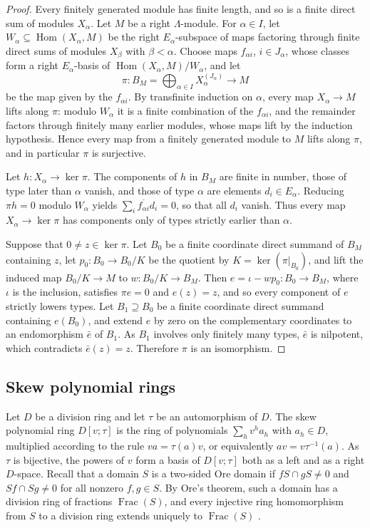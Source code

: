 \documentclass[11pt,a4paper]{amsart}
\numberwithin{equation}{section}
\newcommand{\Hom}{\operatorname{Hom}}
\newcommand{\Frac}{\operatorname{Frac}}
\begin{document}
\begin{proof}
Every finitely generated module has finite length, and so is a finite direct sum of modules $X_\alpha$. Let $M$ be a right $\Lambda$-module. For $\alpha\in I$, let $W_\alpha\subseteq\Hom(X_\alpha,M)$ be the right $E_\alpha$-subspace of maps factoring through finite direct sums of modules $X_\beta$ with $\beta<\alpha$. Choose maps $f_{\alpha i}$, $i\in J_\alpha$, whose classes form a right $E_\alpha$-basis of $\Hom(X_\alpha,M)/W_\alpha$, and let
\[
\pi\colon B_M=\textstyle\bigoplus_{\alpha\in I}X_\alpha^{(J_\alpha)}\to M
\]
be the map given by the $f_{\alpha i}$. By transfinite induction on $\alpha$, every map $X_\alpha\to M$ lifts along $\pi$: modulo $W_\alpha$ it is a finite combination of the $f_{\alpha i}$, and the remainder factors through finitely many earlier modules, whose maps lift by the induction hypothesis. Hence every map from a finitely generated module to $M$ lifts along $\pi$, and in particular $\pi$ is surjective.

Let $h\colon X_\alpha\to\ker\pi$. The components of $h$ in $B_M$ are finite in number, those of type later than $\alpha$ vanish, and those of type $\alpha$ are elements $d_i\in E_\alpha$. Reducing $\pi h=0$ modulo $W_\alpha$ yields $\sum_i\overline{f_{\alpha i}}d_i=0$, so that all $d_i$ vanish. Thus every map $X_\alpha\to\ker\pi$ has components only of types strictly earlier than $\alpha$.

Suppose that $0\ne z\in\ker\pi$. Let $B_0$ be a finite coordinate direct summand of $B_M$ containing $z$, let $p_0\colon B_0\to B_0/K$ be the quotient by $K=\ker(\pi|_{B_0})$, and lift the induced map $B_0/K\to M$ to $w\colon B_0/K\to B_M$. Then $e=\iota-wp_0\colon B_0\to B_M$, where $\iota$ is the inclusion, satisfies $\pi e=0$ and $e(z)=z$, and so every component of $e$ strictly lowers types. Let $B_1\supseteq B_0$ be a finite coordinate direct summand containing $e(B_0)$, and extend $e$ by zero on the complementary coordinates to an endomorphism $\bar e$ of $B_1$. As $B_1$ involves only finitely many types, $\bar e$ is nilpotent, which contradicts $\bar e(z)=z$. Therefore $\pi$ is an isomorphism.
\end{proof}

\subsection{Skew polynomial rings}\label{subsec:skew}

Let $D$ be a division ring and let $\tau$ be an automorphism of $D$. The skew polynomial ring $D[v;\tau]$ is the ring of polynomials $\sum_hv^ha_h$ with $a_h\in D$, multiplied according to the rule $va=\tau(a)v$, or equivalently $av=v\tau^{-1}(a)$. As $\tau$ is bijective, the powers of $v$ form a basis of $D[v;\tau]$ both as a left and as a right $D$-space. Recall that a domain $S$ is a two-sided Ore domain if $fS\cap gS\ne0$ and $Sf\cap Sg\ne0$ for all nonzero $f,g\in S$. By Ore's theorem, such a domain has a division ring of fractions $\Frac(S)$, and every injective ring homomorphism from $S$ to a division ring extends uniquely to $\Frac(S)$ \cite{Co,GW}.
\end{document}
